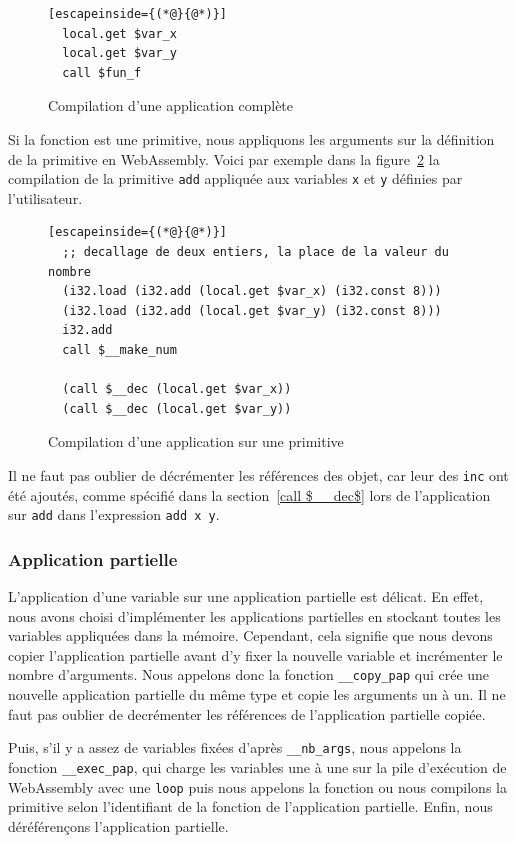 \documentclass{rapportECL}
\begin{document}
\begin{figure}[H]
	\begin{lstlisting}[escapeinside={(*@}{@*)}]
  local.get $var_x
  local.get $var_y
  call $fun_f
	\end{lstlisting}
	\caption{Compilation d'une application complète}
	\label{listing:compile_app_comp_const}
\end{figure}

Si la fonction est une primitive, nous appliquons les arguments sur la définition de la primitive en WebAssembly.
Voici par exemple dans la figure~\ref{listing:compile_add} la compilation de la primitive \verb|add| appliquée aux variables 
\verb|x| et \verb|y| définies par l'utilisateur.

\begin{figure}[H]
	\begin{lstlisting}[escapeinside={(*@}{@*)}]
  ;; decallage de deux entiers, la place de la valeur du nombre
  (i32.load (i32.add (local.get $var_x) (i32.const 8)))
  (i32.load (i32.add (local.get $var_y) (i32.const 8)))
  i32.add
  call $__make_num
  
  (call $__dec (local.get $var_x))
  (call $__dec (local.get $var_y))
	\end{lstlisting}
	\caption{Compilation d'une application sur une primitive}
	\label{listing:compile_add}
\end{figure}

Il ne faut pas oublier de décrémenter les références des objet, car leur des \verb|inc| ont été ajoutés, comme spécifié dans la 
section~\ref{call $__dec$} lors de l'application sur \verb|add| dans l'expression \verb|add x y|.

\subsubsection{Application partielle}

L'application d'une variable sur une application partielle est délicat. En effet, nous avons choisi d'implémenter les applications partielles en stockant toutes les variables appliquées dans la mémoire. Cependant, cela signifie que nous devons copier l'application partielle avant d'y fixer la nouvelle variable et incrémenter le nombre d'arguments. Nous appelons donc la fonction \verb|__copy_pap| qui crée une nouvelle application partielle du même type et copie les arguments un à un. Il ne faut pas oublier de decrémenter les références de l'application partielle copiée.

Puis, s'il y a assez de variables fixées d'après \verb|__nb_args|, nous appelons la fonction \verb|__exec_pap|, qui charge les variables une à une sur la pile d'exécution de WebAssembly avec une \verb|loop| puis nous appelons la fonction ou nous compilons la primitive selon l'identifiant de la fonction de l'application partielle. Enfin, nous déréférençons l'application partielle.
\end{document}
